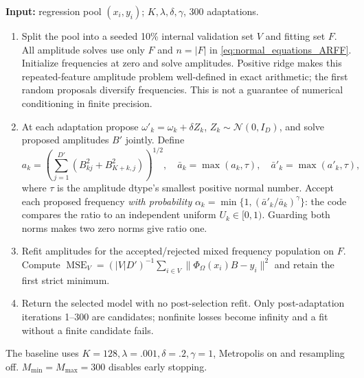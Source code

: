 \documentclass{article}
\begin{document}
\begin{algorithm}[H]\small
\caption{Modern validation-selected ARFF regression (Experiment 8)}\label{alg:ARFF}
\textbf{Input:} regression pool $(x_i,y_i)$; $K,\lambda,\delta,\gamma$, 300 adaptations.
\begin{enumerate}
\item Split the pool into a seeded 10\% internal validation set $V$ and fitting set $F$. All amplitude solves use only $F$ and $n=|F|$ in \eqref{eq:normal_equations_ARFF}. Initialize frequencies at zero and solve amplitudes. Positive ridge makes this repeated-feature amplitude problem well-defined in exact arithmetic; the first random proposals diversify frequencies. This is not a guarantee of numerical conditioning in finite precision.
\item At each adaptation propose $\omega'_k=\omega_k+\delta Z_k$, $Z_k\sim\mathcal N(0,I_D)$, and solve proposed amplitudes $B'$ jointly. Define
\[
a_k=\left(\sum_{j=1}^{D'}(B_{kj}^2+B_{K+k,j}^2)\right)^{1/2},\quad
\bar a_k=\max(a_k,\tau),\quad\bar a'_k=\max(a'_k,\tau),
\]
where $\tau$ is the amplitude dtype's smallest positive normal number. Accept each proposed frequency \emph{with probability}
$\alpha_k=\min\{1,(\bar a'_k/\bar a_k)^\gamma\}$: the code compares the ratio to an independent uniform $U_k\in[0,1)$. Guarding both norms makes two zero norms give ratio one.
\item Refit amplitudes for the accepted/rejected mixed frequency population on $F$. Compute $\operatorname{MSE}_V=(|V|D')^{-1}\sum_{i\in V}\|\Phi_\Omega(x_i)B-y_i\|^2$ and retain the first strict minimum.
\item Return the selected model with no post-selection refit. Only post-adaptation iterations 1--300 are candidates; nonfinite losses become infinity and a fit without a finite candidate fails.
\end{enumerate}
The baseline uses $K=128,\lambda=.001,\delta=.2,\gamma=1$, Metropolis on and resampling off. $M_{\min}=M_{\max}=300$ disables early stopping.
\end{algorithm}
\end{document}

